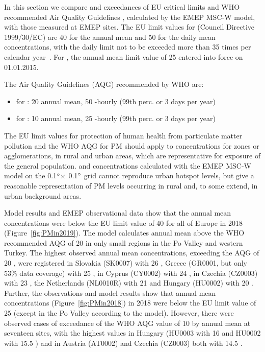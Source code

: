 In this section we compare \PM[10] and \PM[2.5] exceedances
of EU critical limits and WHO recommended Air Quality
Guidelines \citep{WHO:AQG}, calculated by the EMEP MSC-W model, with
those measured at EMEP sites. The EU limit values for \PM[10] (Council
Directive 1999/30/EC) are 40 \ug for the annual mean and 50 \ug for
the daily mean concentrations, with the daily limit not to be exceeded
more than 35 times per calendar year~\citep{EU2008}. For \PM[2.5], the
annual mean limit value of 25 \ug entered into force on 01.01.2015.

The Air Quality Guidelines (AQG) recommended by WHO \citep{WHO:AQG}
are:
\begin{itemize}
\item for \PM[10]: 20 \ug annual mean, 50 -hourly (99th perc. or 3 days per year)
\item for \PM[2.5]: 10 \ug annual mean, 25 -hourly (99th perc. or 3 days per year)
\end{itemize}


The EU limit values for protection of human health from particulate
matter pollution and the WHO AQG for PM should apply to concentrations
for zones or agglomerations, in rural and urban areas,
which are representative for exposure of the general
population. \PM[10] and \PM[2.5] concentrations calculated with the
EMEP MSC-W model on the 0.1$^\circ \times$ 0.1$^\circ$ grid cannot
reproduce urban hotspot levels, but give a reasonable representation
of PM levels occurring in rural and, to some extend, in urban background
areas.


Model results and EMEP observational data show that the annual mean \PM[10] concentrations were below the EU limit value of 40 \ug for all of Europe in 2018 (Figure~\ref{fig:PMin2019}). The model calculates annual mean \PM[10] above the WHO recommended AQG of 20 \ug
in only small regions in the Po Valley and western Turkey. The highest
observed annual mean \PM[10] concentrations, exceeding the AQG of 20 \ug, were registered in Slovakia (SK0007) with 26 \ug, Greece (GR0001, but only 53\% data coverage) with 25 \ug, in Cyprus (CY0002) with 24 \ug, in Czechia (CZ0003) with 23 \ug, the Netherlands (NL0010R) with 21 \ug and Hungary (HU0002) with 20 \ug. Further, the observations and model results show that annual mean \PM[2.5] concentrations (Figure~\ref{fig:PMin2018}) in 2018 were below the EU limit value of 25 \ug (except in the Po Valley according to the model). However, there were observed cases of exceedance of the WHO AQG value of 10 \ug by annual mean \PM[2.5] at seventeen sites, with the highest values in Hungary (HU0003 with 16 \ug and HU0002 with
15.5 \ug) and in Austria (AT0002) and Czechia (CZ0003) both with 14.5 \ug.



